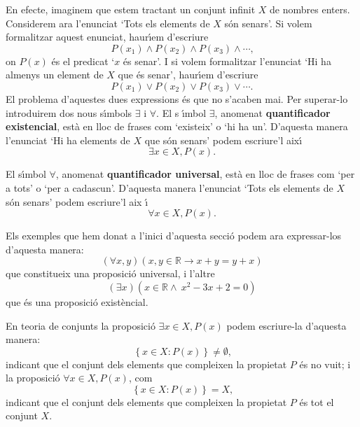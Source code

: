 En efecte, imaginem que estem tractant un conjunt infinit $X$ de nombres
enters. Considerem ara l'enunciat `Tots els elements de $X$ s\'{o}n senars'.
Si volem formalitzar aquest enunciat, haur\'{\i}em d'escriure%
\begin{equation*}
P(x_{1})\wedge P(x_{2})\wedge P(x_{3})\wedge\cdots\text{,}
\end{equation*}
on $P(x)$ \'{e}s el predicat `$x$ \'{e}s senar'. I si volem formalitzar
l'enunciat `Hi ha almenys un element de $X$ que \'{e}s senar', haur\'{\i}em
d'escriure%
\begin{equation*}
P(x_{1})\vee P(x_{2})\vee P(x_{3})\vee\cdots\text{.}
\end{equation*}
El problema d'aquestes dues expressions \'{e}s que no s'acaben mai. Per
superar-lo introduirem dos nous s\'{\i}mbols $\exists$ i $\forall$. El s%
\'{\i}mbol $\exists$, anomenat \textbf{quantificador existencial}, est\`{a}
en lloc de frases com `existeix' o `hi ha un'. D'aquesta manera l'enunciat
`Hi ha elements de $X$ que s\'{o}n senars' podem escriure'l aix\'{\i}%
\begin{equation*}
\exists x\in X,P(x)\text{.}
\end{equation*}

El s\'{\i}mbol $\forall$, anomenat \textbf{quantificador universal}, est\`{a}
en lloc de frases com `per a tots' o `per a cadascun'. D'aquesta manera
l'enunciat `Tots els elements de $X$ s\'{o}n senars' podem escriure'l aix%
\'{\i}%
\begin{equation*}
\forall x\in X,P(x)\text{.}
\end{equation*}

\bigskip

Els exemples que hem donat a l'inici d'aquesta secci\'{o} podem ara
expressar-los d'aquesta manera:
\begin{equation*}
\left( \forall x,y\right) \left( x,y\in\mathbb{R}\longrightarrow
x+y=y+x\right)
\end{equation*}
que constitueix una proposici\'{o} universal, i l'altre%
\begin{equation*}
\left( \exists x\right) \left( x\in\mathbb{R\wedge~}x^{2}-3x+2=0\right)
\end{equation*}
que \'{e}s una proposici\'{o} exist\`{e}ncial.

\begin{obs}
En teoria de conjunts la proposici\'{o} $\exists x\in X,P(x)$ podem
escriure-la d'aquesta manera:%
\begin{equation*}
\left\{ x\in X:P(x)\right\} \neq\emptyset\text{,}
\end{equation*}
indicant que el conjunt dels elements que compleixen la propietat $P$ \'{e}s
no vuit; i la proposici\'{o} $\forall x\in X,P(x)$, com%
\begin{equation*}
\left\{ x\in X:P(x)\right\} =X\text{,}
\end{equation*}
indicant que el conjunt dels elements que compleixen la propietat $P$ \'{e}s
tot el conjunt $X$.
\end{obs}

